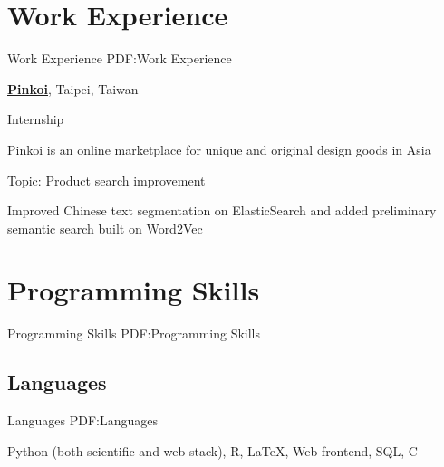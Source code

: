 \documentclass[a4paper,12pt,oneside]{article}
\begin{document}
\begin{body}

\section{Work Experience}
{Work Experience}
{PDF:Work Experience}

\href{http://pinkoi.com}
{\textbf{Pinkoi}},
Taipei, Taiwan
\hfill
{} --
\par
Internship
\begin{detail}
    \begin{detailitem}
    \item Pinkoi is an online marketplace for unique and original design goods in Asia
    \item Topic: Product search improvement
    \item Improved Chinese text segmentation on ElasticSearch and added
        preliminary semantic search built on Word2Vec
    \end{detailitem}
\end{detail}



\section{Programming Skills}
{Programming Skills}
{PDF:Programming Skills}

\subsection{Languages}
{Languages}
{PDF:Languages}

Python (both scientific and web stack),
R,
\LaTeX,
Web frontend,
SQL,
C

%


\end{body}
\end{document}
